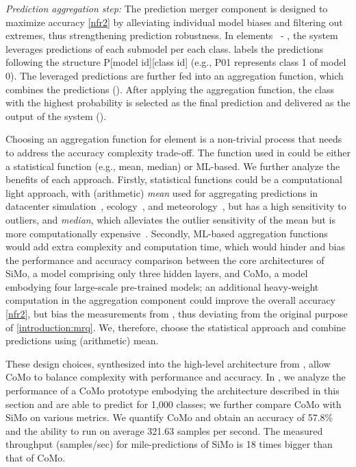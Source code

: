 \textit{Prediction aggregation step:} The prediction merger component is designed to maximize accuracy \ref{nfr2} by alleviating individual model biases and filtering out extremes, thus strengthening prediction robustness. In elements~ - , the system leverages predictions of each submodel per each class.  labels the predictions following the structure P[model id][class id] (e.g., P01 represents class 1 of model 0). The leveraged predictions are further fed into an aggregation function, which combines the predictions (). After applying the aggregation function, the class with the highest probability is selected as the final prediction and delivered as the output of the system ().

Choosing an aggregation function for element  is a non-trivial process that needs to address the accuracy complexity trade-off.
The function used in  could be either a statistical function (e.g., mean, median) or ML-based. We further analyze the benefits of each approach. Firstly, statistical functions could be a computational light approach, with (arithmetic) \textit{mean} used for aggregating predictions in datacenter simulation~\cite{nicolae2025m3sa}, ecology~\cite{harrison2018brief}, and meteorology~\cite{myhre2017multi}, but has a high sensitivity to outliers, and \textit{median}, which alleviates the outlier sensitivity of the mean but is more computationally expensive~\cite{nicolae2025m3sa}. Secondly, ML-based aggregation functions would add extra complexity and computation time, which would hinder and bias the performance and accuracy comparison between the core architectures of SiMo, a model comprising only three hidden layers, and CoMo, a model embodying four large-scale pre-trained models; an additional heavy-weight computation in the aggregation component could improve the overall accuracy \ref{nfr2}, but bias the measurements from , thus deviating from the original purpose of \ref{introduction:mrq}. We, therefore, choose the statistical approach and combine predictions using (arithmetic) mean.  

These design choices, synthesized into the high-level architecture from , allow CoMo to balance complexity with performance and accuracy. In , we analyze the performance of a CoMo prototype embodying the architecture described in this section and are able to predict for 1,000 classes; we further compare CoMo with SiMo on various metrics. We quantify CoMo and obtain an accuracy of 57.8\% and the ability to run on average 321.63 samples per second. The measured throughput (samples/sec) for mile-predictions of SiMo is 18 times bigger than that of CoMo.
